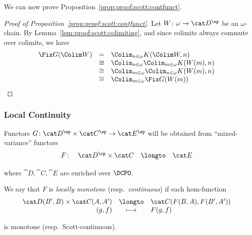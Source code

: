 We can now prove Proposition~\ref{prop:proof:scott:contfunct}.

\begin{proof}[Proof of Proposition~\ref{prop:proof:scott:contfunct}]
Let $W \colon \omega \to \cat D^\ep$ be an $\omega$-chain.
By Lemma~\ref{lem:proof:scott:colimiting},
and since colimits always commute over colimits,
we have
\[
\begin{array}{l l l}
  \Fix G(\Colim W)
& =
& \Colim_{n \in \omega} K(\Colim W,n)
\\
%
& \cong
& \Colim_{n \in \omega} \Colim_{m \in \omega} K(W(m),n)
\\
%
& \cong
& \Colim_{m \in \omega} \Colim_{n \in \omega} K(W(m),n)
\\
%
& \cong
& \Colim_{m \in \omega} \Fix G(W(m))
\end{array}
\]
\end{proof}


\subsubsection{Local Continuity}
Functors $G \colon \cat D^\ep \times \cat C^\ep \to \cat E^\ep$
will be obtained from ``mixed-variance'' functors
\[
\begin{array}{*{4}{l}}
  F \colon
& \cat D^\op \times \cat C
& \longto
& \cat E
\end{array}
\]

\noindent
where
$\cat D,\cat C, \cat E$ are enriched over $\DCPO$.

\begin{definition}
\label{def:proof:scott:loc}
We say that $F$
is \emph{locally} \emph{monotone} (resp.\ \emph{continuous})
if each hom-function
\[
\begin{array}{r c l}
  \cat D(B',B) \times \cat C(A,A')
& \longto
& \cat C(F(B,A), F(B',A'))
\\
%
  (g,f)
& \longmapsto
& F(g,f)
\end{array}
\]

\noindent
is monotone (resp.\ Scott-continuous).
\end{definition}

